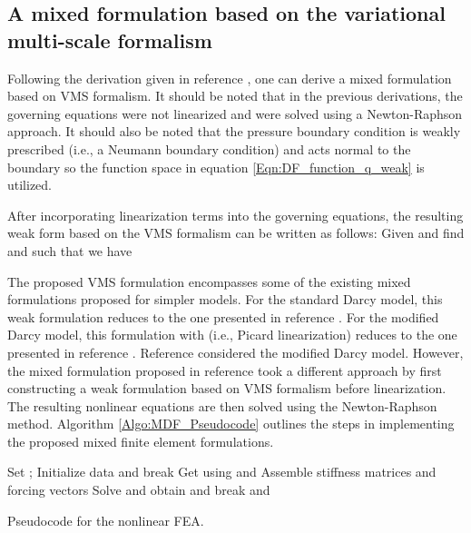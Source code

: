 \documentclass[11pt,reqno]{amsart}
\begin{document}
\subsection{A mixed formulation based on the variational multi-scale formalism}
Following the derivation given in reference 
\cite{Nakshatrala_Turner_Hjelmstad_Masud_CMAME_2006_v195_p4036}, 
one can derive a mixed formulation based on VMS formalism. It 
should be noted that in the previous derivations, the governing 
equations were not linearized and were solved using a Newton-Raphson 
approach. It should also be noted that the pressure boundary 
condition is weakly prescribed (i.e., a Neumann boundary condition) 
and acts normal to the boundary so the function space in equation 
\eqref{Eqn:DF_function_q_weak} is utilized.
 
After incorporating linearization terms into the governing 
equations, the resulting weak form based on the VMS formalism 
can be written as follows: Given  and  
find  and  such that we have 

The proposed VMS formulation encompasses some of the 
existing mixed formulations proposed for simpler 
models. For the standard Darcy model, this weak 
formulation reduces to the one presented in reference 
\cite{Nakshatrala_Turner_Hjelmstad_Masud_CMAME_2006_v195_p4036}.
For the modified Darcy model, this formulation 
with  (i.e., Picard linearization) 
reduces to the one presented in reference 
\cite{Nakshatrala_Turner_2013_arXiv}. 
Reference \cite{Nakshatrala_Rajagopal_IJNMF_2011_v67_p342} 
considered the modified Darcy model. However, the mixed 
formulation proposed in reference 
\cite{Nakshatrala_Rajagopal_IJNMF_2011_v67_p342} 
took a different approach by first constructing 
a weak formulation based on VMS formalism before 
linearization. The resulting nonlinear equations 
are then solved using the Newton-Raphson method. 
Algorithm \ref{Algo:MDF_Pseudocode} outlines 
the steps in implementing the proposed mixed 
finite element formulations. 

\begin{algorithm}[h]
  \begin{algorithmic}
    \State Set ;
    \State Initialize data  and 
     
	    	\State break
	    \EndIf
	    \State Get  using  and 
	    \State Assemble stiffness matrices and forcing vectors
	    \State Solve and obtain  and 
	    	\State break
	    \Else
	    	\State   and 
	    	\State  
	    \EndIf
    \EndWhile
  \end{algorithmic}
  \caption{Pseudocode for the nonlinear FEA. \label{Algo:MDF_Pseudocode}}
\end{algorithm}
 
\end{document}
